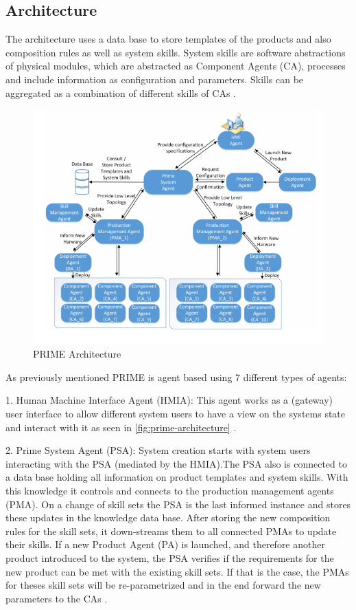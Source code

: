 \documentclass[conference,compsoc,hidelinks]{IEEEtran}
\begin{document}
\subsection{Architecture}
The architecture uses a data base to store templates of the products and also composition rules as well as system skills. System skills are software abstractions of physical modules, which are abstracted as Component Agents (CA), processes and include information as configuration and parameters. Skills can be aggregated as a combination of different skills of CAs \cite{Hybrid}.

\begin{figure}[ht]
	\includegraphics[width=\columnwidth]{img/PRIME-Architecture.png}
	\caption{PRIME Architecture \cite{Hybrid}}
	\label{fig:prime-architecture}
\end{figure}
\noindent
As previously mentioned PRIME is agent based using 7 different types of agents:

1. Human Machine Interface Agent (HMIA): This agent works as a (gateway) user interface to allow different system users to have a view on the systems state and interact with it as seen in \autoref{fig:prime-architecture} \cite{Hybrid}.

2. Prime System Agent (PSA): System creation starts with system users interacting with the PSA (mediated by the HMIA).The PSA also is connected to a data base holding all information on product templates and system skills. With this knowledge it controls and connects to the production management agents (PMA). On a change of skill sets the PSA is the last informed instance and stores these updates in the knowledge data base. After storing the new composition rules for the skill sets, it down-streams them to all connected PMAs to update their skills. If a new Product Agent (PA) is launched, and therefore another product introduced to the system, the PSA verifies if the requirements for the new product can be met with the existing skill sets. If that is the case, the PMAs for theses skill sets will be re-parametrized and in the end forward the new parameters to the CAs \cite{Hybrid}.
\end{document}
